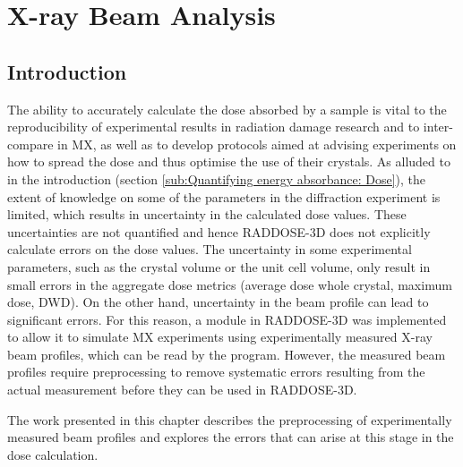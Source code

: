 \chapter{X-ray Beam Analysis}
\label{chap:X-ray Beam Analysis}

\section{Introduction}
\label{sec:Introduction - Beam chapter}
The ability to accurately calculate the dose absorbed by a sample is vital to the reproducibility of experimental results in radiation damage research and to inter-compare in MX, as well as to develop protocols aimed at advising experiments on how to spread the dose and thus optimise the use of their crystals.
As alluded to in the introduction (section \ref{sub:Quantifying energy absorbance: Dose}), the extent of knowledge on some of the parameters in the diffraction experiment is limited, which results in uncertainty in the calculated dose values.
These uncertainties are not quantified and hence RADDOSE-3D does not explicitly calculate errors on the dose values.
The uncertainty in some experimental parameters, such as the crystal volume or the unit cell volume, only result in small errors in the aggregate dose metrics (average dose whole crystal, maximum dose, DWD).
On the other hand, uncertainty in the beam profile can lead to significant errors.
For this reason, a module in RADDOSE-3D was implemented to allow it to simulate MX experiments using experimentally measured X-ray beam profiles, which can be read by the program.
However, the measured beam profiles require preprocessing to remove systematic errors resulting from the actual measurement before they can be used in RADDOSE-3D.

The work presented in this chapter describes the preprocessing of experimentally measured beam profiles and explores the errors that can arise at this stage in the dose calculation.
